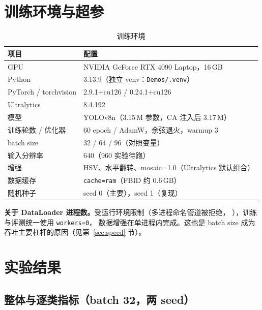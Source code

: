 \documentclass[UTF8,a4paper,11pt]{ctexart}
\begin{document}
\section{训练环境与超参}

\begin{table}[htbp]
\centering
\caption{训练环境}
\begin{tabular}{ll}
\toprule
项目 & 配置 \\
\midrule
GPU & NVIDIA GeForce RTX 4090 Laptop，16\,GB \\
Python & 3.13.9（独立 venv：\texttt{Demos/.venv}） \\
PyTorch / torchvision & 2.9.1+cu126 / 0.24.1+cu126 \\
Ultralytics & 8.4.192 \\
模型 & YOLOv8n（3.15\,M 参数，CA 注入后 3.17\,M） \\
训练轮数 / 优化器 & 60 epoch / AdamW，余弦退火，warmup 3 \\
batch size & 32 / 64 / 96（对照变量） \\
输入分辨率 & 640（960 实验待跑） \\
增强 & HSV、水平翻转、mosaic=1.0（Ultralytics 默认组合） \\
数据缓存 & \texttt{cache=ram}（FBID 约 0.6\,GB） \\
随机种子 & seed 0（主要），seed 1（复现） \\
\bottomrule
\end{tabular}
\end{table}

\noindent\textbf{关于 DataLoader 进程数。}受运行环境限制（多进程命名管道被拒绝，
），训练与评测统一使用 \texttt{workers=0}，
数据增强在单进程内完成。这也是 batch size 成为吞吐主要杠杆的原因（见第~\ref{sec:speed} 节）。

\section{实验结果}

\subsection{整体与逐类指标（batch 32，两 seed）}
\end{document}

